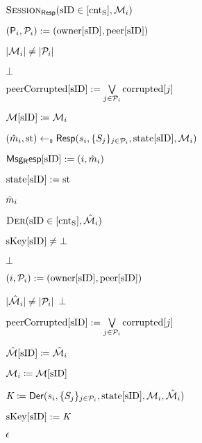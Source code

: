 \begin{figure}[h!]
{{\begin{minipage}[t]{0.6\textwidth}
\underline{$\GakeResO(\sID \in [\cntS], \GakeIniMesSet[{i}] )$} 
\begin{nicodemus}
	\item $(\GIni,\PartySet_{i}) := (\owner[\sID],\peer[\sID])$
	\item \pcif $|\GakeIniMesSet[{i}]| \neq |\PartySet_{i}|$ 
	\item \quad  \pcreturn $\bot$ 
	\item $\peercorrupted[\sID] := \bigvee\limits_{ j \in \PartySet_{i}} \corrupted[j]$
	\item $\GIniMesSet[\sID] \coloneqq  \GakeIniMesSet[{i}]$ \label{line:gake-problem-a}
	\item $(\GakeResMes_{i}, \Gstate) \getsr \GakeRes(\GakeSk[i], \{\GakePk[j]\}_{j \in \PartySet_{i}}, \Gstates[\GakeResUsID], \GakeIniMesSet[{i}])$
	\item $\GResMes[\sID]:=({i},\GakeResMes_{i})$
	\item $\Gstates[\sID]:= \Gstate$
	\item \pcreturn $\GakeResMes_{i}$ \\
\end{nicodemus}
\underline{$\GakeDerO(\GakeResUsID \in [\cntS],  \GakeResMesSet[{i}])$} 
\begin{nicodemus}
	\item \pcif $\skeys[\GakeResUsID] \neq \bot$  
	\item \quad \pcreturn $\bot$
	\item $({i},\PartySet_{i}) := (\owner[\GakeResUsID],\peer[\GakeResUsID])$
	\item \pcif $|\GakeResMesSet[{i}]| \neq |\PartySet_{i}|$ \pcreturn $\bot$
	\item $\peercorrupted[\sID] := \bigvee\limits_{ j \in \PartySet_{i}} \corrupted[j]$
	\item $\GResMesSet[\sID] \coloneqq \GakeResMesSet[{i}]$ \label{line:gake-problem-b}
	\item $\GakeIniMesSet[{i}] \coloneqq \GIniMesSet[\sID]$
	\item $\GakeSessKey \coloneqq \GakeDer(\GakeSk[{i}], \{\GakePk[j]\}_{j \in \PartySet_{i}}, \Gstates[\GakeResUsID], \GakeIniMesSet[{i}], \GakeResMesSet[{i}])$
	\item $\skeys[\GakeResUsID] :=  \GakeSessKey$
	\item \pcreturn $\emptystr$\\
\end{nicodemus}
\end{minipage}
\begin{minipage}[t]{0.4\textwidth}


\end{minipage}}}
\end{figure}
